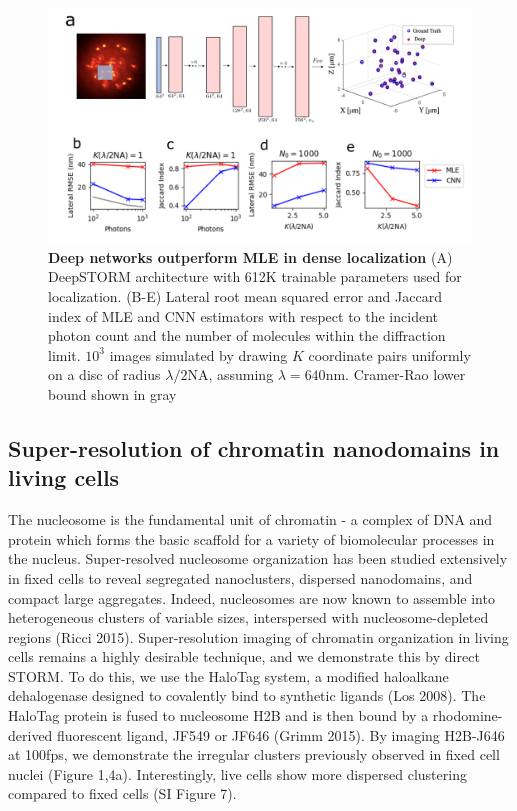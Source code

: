 \documentclass{ucetd}
\begin{document}
\begin{figure}
\includegraphics[width=15cm]{PSF2D.png}
\caption{\textbf{Deep networks outperform MLE in dense localization} (A) DeepSTORM architecture with 612K trainable parameters used for localization. (B-E) Lateral root mean squared error and Jaccard index of MLE and CNN estimators with respect to the incident photon count and the number of molecules within the diffraction limit. $10^3$ images simulated by drawing $K$ coordinate pairs uniformly on a disc of radius $\lambda/2\mathrm{NA}$, assuming $\lambda = 640\mathrm{nm}$. Cramer-Rao lower bound shown in gray}
\end{figure}


\subsection{Super-resolution of chromatin nanodomains in living cells}

The nucleosome is the fundamental unit of chromatin - a complex of DNA and protein which forms the basic scaffold for a variety of biomolecular processes in the nucleus. Super-resolved nucleosome organization has been studied extensively in fixed cells to reveal segregated nanoclusters, dispersed nanodomains, and compact large aggregates. Indeed, nucleosomes are now known to assemble into heterogeneous clusters of variable sizes, interspersed with nucleosome-depleted regions (Ricci 2015). Super-resolution imaging of chromatin organization in living cells remains a highly desirable technique, and we demonstrate this by direct STORM. To do this, we use the HaloTag system, a modified haloalkane dehalogenase designed to covalently bind to synthetic ligands  (Los 2008). The HaloTag protein is fused to nucleosome H2B and is then bound by a rhodomine-derived fluorescent ligand, JF549 or JF646 (Grimm 2015). By imaging H2B-J646 at 100fps, we demonstrate the irregular clusters previously observed in fixed cell nuclei (Figure 1,4a). Interestingly, live cells show more dispersed clustering compared to fixed cells (SI Figure 7).
\end{document}
